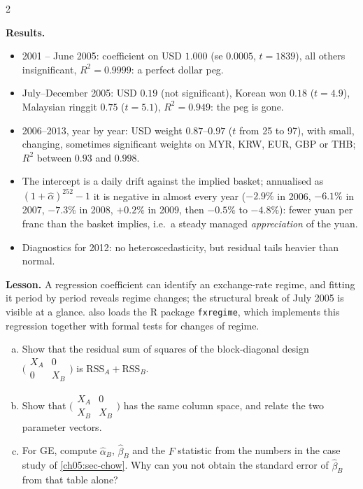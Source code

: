 \begin{paracol}{2}
\begin{casestudy}
\textbf{Results.}
\begin{itemize}
  \item 2001 -- June 2005: coefficient on USD $1.000$ (se $0.0005$, $t=1839$), all others insignificant,
        $R^2=0.9999$: a perfect dollar peg.
  \item July--December 2005: USD $0.19$ (not significant), Korean won $0.18$ ($t=4.9$), Malaysian ringgit $0.75$
        ($t=5.1$), $R^2=0.949$: the peg is gone.
  \item 2006--2013, year by year: USD weight $0.87$--$0.97$ ($t$ from 25 to 97), with small, changing, sometimes
        significant weights on MYR, KRW, EUR, GBP or THB; $R^2$ between $0.93$ and $0.998$.
  \item The intercept is a daily drift against the implied basket; annualised as $(1+\hat\alpha)^{252}-1$ it is negative in
        almost every year ($-2.9\%$ in 2006, $-6.1\%$ in 2007, $-7.3\%$ in 2008, $+0.2\%$ in 2009, then $-0.5\%$ to $-4.8\%$):
        fewer yuan per franc than the basket implies, i.e.\ a steady managed \emph{appreciation} of the yuan.
  \item Diagnostics for 2012: no heteroscedasticity, but residual tails heavier than normal.
\end{itemize}
\textbf{Lesson.} A regression coefficient can identify an exchange-rate regime, and fitting it period by period reveals
regime changes; the structural break of July 2005 is visible at a glance.  also loads the R
package \texttt{fxregime}, which implements this regression together with formal tests for changes of regime.
\end{casestudy}

\begin{exercise}
\leavevmode
\begin{enumerate}[(a)]
  \item Show that the residual sum of squares of the block-diagonal design $\bigl(\begin{smallmatrix}X_A&0\\0&X_B\end{smallmatrix}\bigr)$ is
      $\text{RSS}_A+\text{RSS}_B$.
  \item Show that $\bigl(\begin{smallmatrix}X_A&0\\X_B&X_B\end{smallmatrix}\bigr)$ has the same column space, and relate the two
      parameter vectors.
  \item For GE, compute $\hat\alpha_B$, $\hat\beta_B$ and the $F$ statistic from the numbers in the case study of
      \cref{ch05:sec-chow}. Why can you not obtain the standard error of $\hat\beta_B$ from that table alone?
\end{enumerate}
\end{exercise}


\end{paracol}
